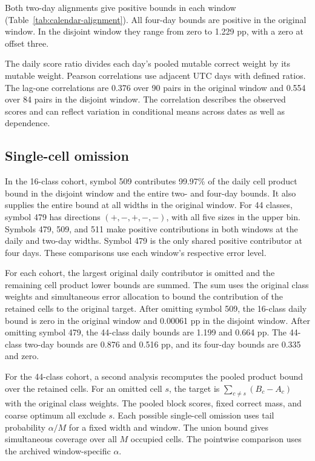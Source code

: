 \documentclass[preprint,11pt]{elsarticle}
\begin{document}
Both two-day alignments give positive bounds in each window (Table~\ref{tab:calendar-alignment}). All four-day bounds are positive in the original window. In the disjoint window they range from zero to 1.229 pp, with a zero at offset three.

The daily score ratio divides each day's pooled mutable correct weight by its mutable weight. Pearson correlations use adjacent UTC days with defined ratios. The lag-one correlations are 0.376 over 90 pairs in the original window and 0.554 over 84 pairs in the disjoint window. The correlation describes the observed scores and can reflect variation in conditional means across dates as well as dependence.

\subsection{Single-cell omission}

In the 16-class cohort, symbol 509 contributes 99.97\% of the daily cell product bound in the disjoint window and the entire two- and four-day bounds. It also supplies the entire bound at all widths in the original window. For 44 classes, symbol 479 has directions $(+,-,+,-,-)$, with all five sizes in the upper bin. Symbols 479, 509, and 511 make positive contributions in both windows at the daily and two-day widths. Symbol 479 is the only shared positive contributor at four days. These comparisons use each window's respective error level.

For each cohort, the largest original daily contributor is omitted and the remaining cell product lower bounds are summed. The sum uses the original class weights and simultaneous error allocation to bound the contribution of the retained cells to the original target. After omitting symbol 509, the 16-class daily bound is zero in the original window and 0.00061 pp in the disjoint window. After omitting symbol 479, the 44-class daily bounds are 1.199 and 0.664 pp. The 44-class two-day bounds are 0.876 and 0.516 pp, and its four-day bounds are 0.335 and zero.

For the 44-class cohort, a second analysis recomputes the pooled product bound over the retained cells. For an omitted cell $s$, the target is $\sum_{c\ne s}(B_c-A_c)$ with the original class weights. The pooled block scores, fixed correct mass, and coarse optimum all exclude $s$. Each possible single-cell omission uses tail probability $\alpha/M$ for a fixed width and window. The union bound gives simultaneous coverage over all $M$ occupied cells. The pointwise comparison uses the archived window-specific $\alpha$.
\end{document}

